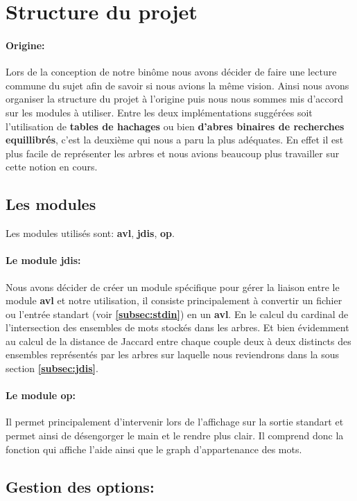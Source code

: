 \documentclass{article}
\begin{document}
\section{Structure du projet}

\paragraph{Origine:}
Lors de la conception de notre binôme nous avons décider de faire une lecture commune du sujet
afin de savoir si nous avions la même vision. Ainsi nous avons organiser la structure du projet
à l'origine puis nous nous sommes mis d'accord sur les modules à utiliser. Entre les deux
implémentations suggérées soit l'utilisation de \textbf{tables de hachages} ou bien \textbf{d'abres binaires
de recherches equillibrés}, c'est la deuxième qui nous a paru la plus adéquates. En effet il est plus
facile de représenter les arbres et nous avions beaucoup plus travailler sur cette notion en cours.

\subsection{Les modules}
Les modules utilisés sont: \textbf{avl}, \textbf{jdis}, \textbf{op}.

\paragraph{Le module jdis:}
Nous avons décider de créer un module spécifique pour gérer la liaison entre le module \textbf{avl}
et notre utilisation, il consiste principalement à convertir un fichier ou l'entrée standart (voir \textbf{\ref{subsec:stdin}})
en un \textbf{avl}. En le calcul du cardinal de l'intersection des ensembles de mots stockés dans les
arbres. Et bien évidemment au calcul de la distance de Jaccard entre chaque couple deux à deux distincts
des ensembles représentés par les arbres sur laquelle nous reviendrons dans la sous section \textbf{\ref{subsec:jdis}}.

\paragraph{Le module op:}
Il permet principalement d'intervenir lors de l'affichage sur la sortie standart et permet ainsi de 
désengorger le main et le rendre plus clair. Il comprend donc la fonction qui affiche l'aide ainsi que le 
graph d'appartenance des mots.

\subsection{Gestion des options:}
\end{document}
